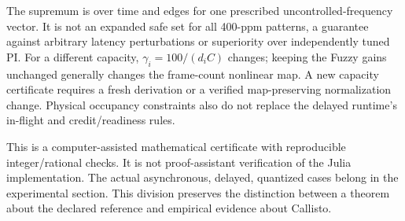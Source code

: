 The supremum is over time and edges for one prescribed uncontrolled-frequency
vector. It is not an expanded safe set for all 400-ppm patterns, a guarantee
against arbitrary latency perturbations or superiority over independently
tuned PI. For a different capacity, $\gamma_i=100/(d_iC)$ changes; keeping
the Fuzzy gains unchanged generally changes the frame-count nonlinear
map. A new capacity certificate requires a fresh derivation or a verified
map-preserving normalization change. Physical occupancy constraints also
do not replace the delayed runtime's in-flight and credit/readiness rules.

This is a computer-assisted mathematical certificate with reproducible
integer/rational checks. It is not proof-assistant verification of the
Julia implementation. The actual asynchronous, delayed, quantized cases
belong in the experimental section. This division preserves the distinction
between a theorem about the declared reference and empirical evidence
about Callisto.

